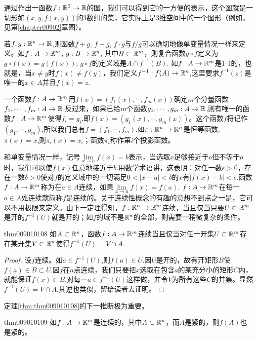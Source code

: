 通过作出一函数$f: \mathbb{R}^2 \to \mathbb{R}$的图，我们可以得到它的一方便的表示，这个图就是一切形如$(x, y, f(x, y))$的3数组的集，它实际上是3维空间中的一个图形（例如，见第\ref{chapter00902}章图）。

若$f,g:\mathbb{R}^n \to \mathbb{R}$,则函数$f+g$, $f-g$, $f \cdot g$与$f/g$可以确切地像单变量情况一样来定义。如$f:A \to \mathbb{R}^m$, $g: B \to \mathbb{R}^p$, 其中$B \subset \mathbb{R}^m$，则复合函数$g \circ f$定义为$g\circ f(x)= g(f(x))$; $g \circ f$的定义域是$A \cap f^{-1}(B)$. 如$f: A \to \mathbb{R}^m$是1-1的，也就是，当$x \neq y$时$f(x) \neq f(y)$，我们定义$f^{-1}:f(A) \to \mathbb{R}^n$,这里要求$f^{-1}(z)$是唯一的$x \in A$并且$f(x)=z$.

一个函数$f:A \to \mathbb{R}^m$用$f(x)=(f_1(x), \cdots, f_m(x))$确定$m$个分量函数$f_1, \cdots, f_m:A \to \mathbb{R}$.反过来，如果已给$m$个函数$g_1,\cdots, g_m:A \to \mathbb{R}$,则有唯一的函数$f:A \to \mathbb{R}^m$使得$f_i = g_i$,即$f(x)=(g_1(x),\cdots, g_m(x))$。这个函数$f$将记作$(g_1, \cdots, g_m)$,所以我们总有$f=(f_1,\cdots, f_m)$.如$\pi:\mathbb{R}^n \to \mathbb{R}^n$是恒等函数, $\pi(x)=x$,则$\pi_i(x)=x_i$；函数$\pi_i$称作第$i$个投影函数。

和单变量情况一样，记号$\lim\limits_{x \to a}{f(x)} = b$表示，当选取$x$足够接近于$a$但不等于$a$时，我们可以使$f(x)$任意地接近于$b$.用数学术语讲，这表明：对任一数$\epsilon>0$，存在一数$\delta>0$使对$f$的定义域中的一切满足$0 < |x-a| < \delta$的$x$有$|f(x) - b| < \epsilon$.函数$f:A \to \mathbb{R}^m$称为在$a \in A$连续，如果$\lim\limits_{x \to a}{f(x)} = f(a)$. $f:A \to \mathbb{R}^m$在每一$a \in A$处连续就简称$f$是连续的。关于连续性概念的有趣的意想不到点之一是，它可以不用极限来定义。由下一定理得知，$f:\mathbb{R}^n \to \mathbb{R}^m$连续，当且仅当只要$U \subset \mathbb{R}^m$是开的$f^{-1}(U)$就是开的；如$f$的域不是$\mathbb{R}^n$的全部，则需要一稍微复杂的条件。

\begin{theorem}{}{thm009010108}
如$A \subset \mathbb{R}^n$，函数$f:A \to \mathbb{R}^m$连续当且仅当对任一开集$U \subset \mathbb{R}^m$存在某开集$V \subset \mathbb{R}^n$使得$f^{-1}(U) = V \cap A$.
\end{theorem}

\begin{proof}
设$f$连续。如$a \in f^{-1}(U)$,则$f(a) \in U$.因$U$是开的，故有开矩形$B$使$f(a) \in B \subset U$.因$f$在$a$点连续，我们只要把$x$选取在包含$a$的某充分小的矩形$C$内，就能保证$f(x) \in B$.对每一$a \in f^{-1}(U)$这样做，并令$V$为所有这些$C$的并集。显然$f^{-1}(U) = V \cap A$.其逆也类似，留给读者去证明。
\end{proof}

定理\ref{thm:thm009010108}的下一推断极为重要。
\begin{theorem}{}{thm009010109}
如$f:A \to \mathbb{R}^m$是连续的，其中$A \subset \mathbb{R}^n$，而$A$是紧的，则$f(A)$也是紧的。
\end{theorem}

